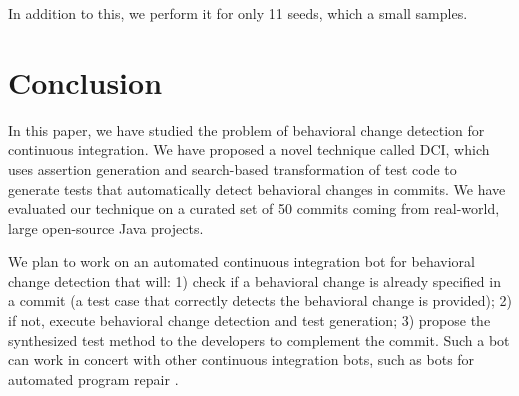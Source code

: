In addition to this, we perform it for only 11 seeds, which a small samples.

\section{Conclusion}
\label{sec:conclusion}

In this paper, we have studied the problem of behavioral change detection for continuous integration. 
We have proposed a novel technique called DCI, which uses assertion generation and search-based transformation of test code to generate tests that automatically detect behavioral changes in commits.
We have evaluated our technique on a curated set of 50 commits coming from real-world, large open-source Java projects.

We plan to work on an automated continuous integration bot for behavioral change detection that will:
1) check if a behavioral change is already specified in a commit (\ie a test case that correctly detects the behavioral change is provided);
2) if not, execute behavioral change detection and test generation;
3) propose the synthesized test method to the developers to complement the commit.
Such a bot can work in concert with other continuous integration bots, such as bots for automated program repair \cite{repairnator}.